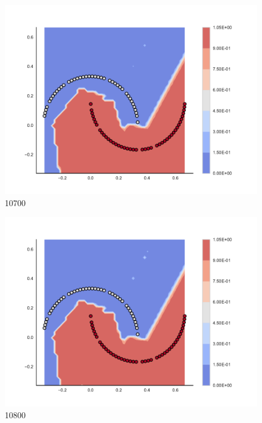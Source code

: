 \begin{subfigure}[b]{0.09\textwidth}
    \includegraphics[clip, trim=2.35cm 1.75cm 4.5cm 0cm,width=\textwidth]{img/convergence/10700.pdf}
    \caption{10700}
    \label{fig:convergence_10700}
\end{subfigure}
%
\begin{subfigure}[b]{0.09\textwidth}
    \includegraphics[clip, trim=2.35cm 1.75cm 4.5cm 0cm,width=\textwidth]{img/convergence/10800.pdf}
    \caption{10800}
    \label{fig:convergence_10800}
\end{subfigure}
%
